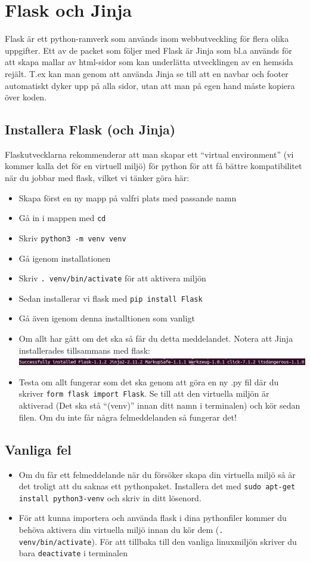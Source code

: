 \documentclass{TDP003mall}
\begin{document}
\section*{Flask och Jinja}
Flask är ett python-ramverk som används inom webbutveckling för flera olika uppgifter. Ett av de packet som följer med Flask är Jinja som bl.a används för att skapa mallar av html-sidor som kan underlätta utvecklingen av en hemsida rejält. T.ex kan man genom att använda Jinja se till att en navbar och footer automatiskt dyker upp på alla sidor, utan att man på egen hand måste kopiera över koden.
\subsection*{Installera Flask (och Jinja)}
Flaskutvecklarna rekommenderar att man skapar ett ``virtual environment'' (vi kommer kalla det för en virtuell miljö) för python för att få bättre kompatibilitet när du jobbar med flask, vilket vi tänker göra här:
\begin{itemize}
\item Skapa först en ny mapp på valfri plats med passande namn
\item Gå in i mappen med \texttt{cd}
\item Skriv \texttt{python3 -m venv venv}
\item Gå igenom installationen
\item Skriv \texttt{. venv/bin/activate} för att aktivera miljön
\item Sedan installerar vi flask med \texttt{pip install Flask}
\item Gå även igenom denna installtionen som vanligt
\item Om allt har gått om det ska så får du detta meddelandet. Notera att Jinja installerades tillsammans med flask:\\
\includegraphics[width=170mm]{Flask2}
\item Testa om allt fungerar som det ska genom att göra en ny .py fil där du skriver \texttt{form flask import Flask}. Se till att den virtuella miljön är aktiverad (Det ska stå ``(venv)'' innan ditt namn i terminalen) och kör sedan filen. Om du inte får några felmeddelanden så fungerar det!

  
\end{itemize}
\subsection*{Vanliga fel}
\begin{itemize}
\item Om du får ett felmeddelande när du försöker skapa din virtuella miljö så är det troligt att du saknas ett pythonpaket. Installera det med \texttt{sudo apt-get install python3-venv} och skriv in ditt lösenord.
\item För att kunna importera och använda flask i dina pythonfiler kommer du behöva aktivera din virtuella miljö innan du kör dem (\texttt{. venv/bin/activate}). För att tillbaka till den vanliga linuxmiljön skriver du bara \texttt{deactivate} i terminalen
\end{itemize}
\end{document}

